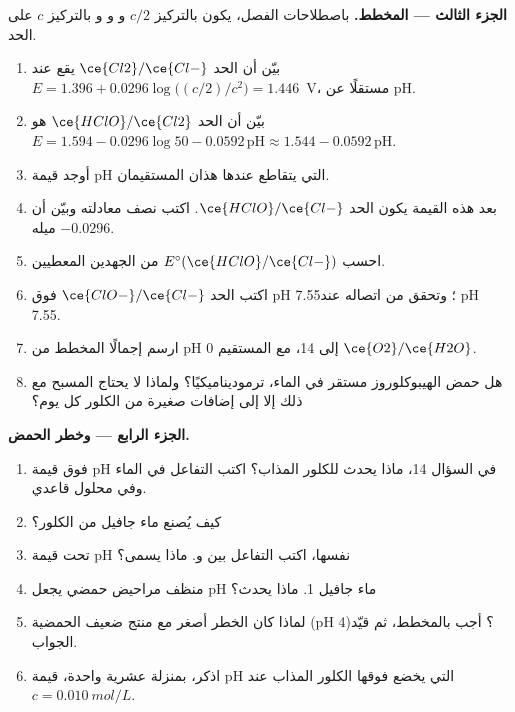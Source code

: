 \begin{problem}
\medskip
\noindent\textbf{الجزء الثالث --- المخطط.}
باصطلاحات الفصل، يكون  بالتركيز $c/2$
و و و بالتركيز $c$ على الحد.
\begin{enumerate}[resume]
  \item بيّن أن الحد $\ce{Cl2}/\ce{Cl-}$ يقع عند $E = 1.396 +
        0.0296\log\bigl((c/2)/c^2\bigr) = 1.446$~V، مستقلًا عن pH.
  \item بيّن أن الحد $\ce{HClO}/\ce{Cl2}$ هو $E = 1.594 -
        0.0296\log 50 - 0.0592\,\mathrm{pH} \approx 1.544 -
        0.0592\,\mathrm{pH}$.
  \item أوجد قيمة pH التي يتقاطع عندها هذان المستقيمان.
  \item بعد هذه القيمة يكون الحد $\ce{HClO}/\ce{Cl-}$. اكتب
        نصف معادلته وبيّن أن ميله $-0.0296$.
  \item احسب $E^\circ(\ce{HClO}/\ce{Cl-})$ من الجهدين المعطيين.
  \item اكتب الحد $\ce{ClO-}/\ce{Cl-}$ فوق pH 7.55؛ وتحقق من
        اتصاله عند pH 7.55.
  \item ارسم إجمالًا المخطط من pH 0 إلى 14، مع المستقيم $\ce{O2}/\ce{H2O}$.
  \item هل حمض الهيبوكلوروز مستقر في الماء، ترموديناميكيًا؟ ولماذا
        لا يحتاج المسبح مع ذلك إلا إلى إضافات صغيرة من الكلور كل يوم؟
\end{enumerate}

\medskip
\noindent\textbf{الجزء الرابع ---  وخطر الحمض.}
\begin{enumerate}[resume]
  \item فوق قيمة pH في السؤال 14، ماذا يحدث للكلور المذاب؟
        اكتب التفاعل في الماء وفي محلول قاعدي.
  \item كيف يُصنع ماء جافيل من الكلور؟
  \item تحت قيمة pH نفسها، اكتب التفاعل بين 
        و. ماذا يسمى؟
  \item منظف مراحيض حمضي يجعل pH ماء جافيل 1. ماذا يحدث؟
  \item لماذا كان الخطر أصغر مع منتج ضعيف الحمضية
        (pH 4)؟ أجب بالمخطط، ثم قيّد الجواب.
  \item اذكر، بمنزلة عشرية واحدة، قيمة pH التي يخضع فوقها الكلور المذاب
         عند $c = \qty{0.010}{mol/L}$.
\end{enumerate}
\end{problem}
